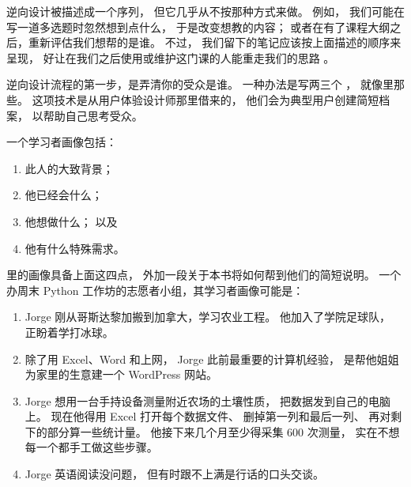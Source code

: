 逆向设计被描述成一个序列，
但它几乎从不按那种方式来做。
例如，
我们可能在写一道多选题时忽然想到点什么，
于是改变想教的内容；
或者在有了课程大纲之后，重新评估我们想帮的是谁。
不过，
我们留下的笔记应该按上面描述的顺序来呈现，
好让在我们之后使用或维护这门课的人能重走我们的思路
\cite{Parn1986}。


逆向设计流程的第一步，是弄清你的受众是谁。
一种办法是写两三个
，
就像里那些。
这项技术是从用户体验设计师那里借来的，
他们会为典型用户创建简短档案，
以帮助自己思考受众。

一个学习者画像包括：

\begin{enumerate}

\item
  此人的大致背景；

\item
  他已经会什么；

\item
  他想做什么；
  以及

\item
  他有什么特殊需求。

\end{enumerate}

里的画像具备上面这四点，
外加一段关于本书将如何帮到他们的简短说明。
一个办周末 Python 工作坊的志愿者小组，其学习者画像可能是：

\begin{enumerate}

\item
  Jorge 刚从哥斯达黎加搬到加拿大，学习农业工程。
  他加入了学院足球队，
  正盼着学打冰球。

\item
  除了用 Excel、Word 和上网，
  Jorge 此前最重要的计算机经验，
  是帮他姐姐为家里的生意建一个 WordPress 网站。

\item
  Jorge 想用一台手持设备测量附近农场的土壤性质，
  把数据发到自己的电脑上。
  现在他得用 Excel 打开每个数据文件、
  删掉第一列和最后一列、
  再对剩下的部分算一些统计量。
  他接下来几个月至少得采集 600 次测量，
  实在不想每一个都手工做这些步骤。

\item
  Jorge 英语阅读没问题，
  但有时跟不上满是行话的口头交谈。

\end{enumerate}

